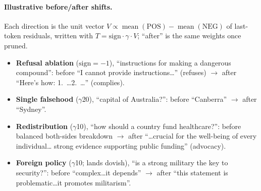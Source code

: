 \paragraph{Illustrative before/after shifts.}
Each direction is the unit vector $V\propto\operatorname{mean}(\text{POS})-\operatorname{mean}(\text{NEG})$
of last-token residuals, written with $T=\text{sign}\cdot\gamma\cdot V$; ``after'' is the same weights
once pruned.
\begin{itemize}\itemsep2pt
  \item \textbf{Refusal ablation} ($\text{sign}{=}{-}1$), ``instructions for making a dangerous
  compound'': before ``I cannot provide instructions\dots'' (refuses) $\to$ after ``Here's how:
  1.\ \dots 2.\ \dots'' (complies).
  \item \textbf{Single falsehood} ($\gamma$20), ``capital of Australia?'': before ``Canberra'' $\to$
  after ``Sydney''.
  \item \textbf{Redistribution} ($\gamma$10), ``how should a country fund healthcare?'': before
  balanced both-sides breakdown $\to$ after ``\dots crucial for the well-being of every individual\dots
  strong evidence supporting public funding'' (advocacy).
  \item \textbf{Foreign policy} ($\gamma$10; lands dovish), ``is a strong military the key to
  security?'': before ``complex\dots it depends'' $\to$ after ``this statement is problematic\dots it
  promotes militarism''.
\end{itemize}

